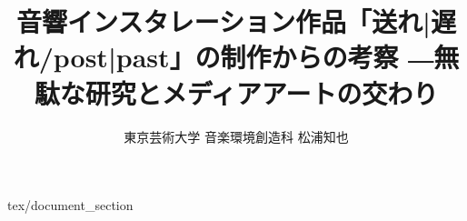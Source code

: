 \documentclass[report,twocolumn]{jsbook}
\title {音響インスタレーション作品「送れ|遅れ/post|past」の制作からの考察 ―無駄な研究とメディアアートの交わり}
\author {東京芸術大学 音楽環境創造科 松浦知也}
\begin{document}
\maketitle

\tableofcontents

 {tex/document_section}



\end{document}

